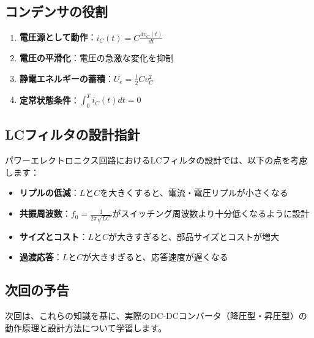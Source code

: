 \subsection{コンデンサの役割}

\begin{enumerate}
\item \textbf{電圧源として動作}：$i_C(t) = C \frac{dv_C(t)}{dt}$
\item \textbf{電圧の平滑化}：電圧の急激な変化を抑制
\item \textbf{静電エネルギーの蓄積}：$U_e = \frac{1}{2}Cv_C^2$
\item \textbf{定常状態条件}：$\int_0^T i_C(t)dt = 0$
\end{enumerate}

\subsection{LCフィルタの設計指針}

パワーエレクトロニクス回路におけるLCフィルタの設計では、以下の点を考慮します：

\begin{itemize}
\item \textbf{リプルの低減}：$L$と$C$を大きくすると、電流・電圧リプルが小さくなる
\item \textbf{共振周波数}：$f_0 = \frac{1}{2\pi\sqrt{LC}}$がスイッチング周波数より十分低くなるように設計
\item \textbf{サイズとコスト}：$L$と$C$が大きすぎると、部品サイズとコストが増大
\item \textbf{過渡応答}：$L$と$C$が大きすぎると、応答速度が遅くなる
\end{itemize}

\subsection{次回の予告}

次回は、これらの知識を基に、実際のDC-DCコンバータ（降圧型・昇圧型）の動作原理と設計方法について学習します。

